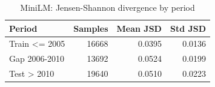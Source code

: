 \begin{table}[ht]
\centering
\caption{MiniLM: Jensen-Shannon divergence by period}
\label{tab:minilm_period_jsd_summary}
\begin{tabular}{lrrr}
\toprule
Period & Samples & Mean JSD & Std JSD \\
\midrule
Train <= 2005 & 16668 & 0.0395 & 0.0136 \\
Gap 2006-2010 & 13692 & 0.0524 & 0.0199 \\
Test > 2010 & 19640 & 0.0510 & 0.0223 \\
\bottomrule
\end{tabular}
\end{table}
